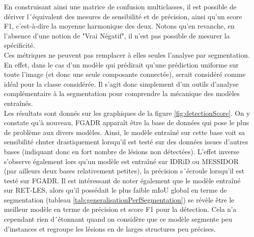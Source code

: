 En construisant ainsi une matrice de confusion multiclasses, il est possible de dériver l´équivalent des mesures de sensibilité et de précision, ainsi qu'un score F1, c'est-à-dire la moyenne harmonique des deux. Notons qu'en revanche, en l'absence d'une notion de "Vrai Négatif", il n'est pas possible de mesurer la spécificité. \\
Ces métriques ne peuvent pas remplacer à elles seules l'analyse par segmentation. En effet, dans le cas d'un modèle qui prédirait qu'une prédiction uniforme sur toute l'image (et donc une seule composante connectée), serait considéré comme idéal pour la classe considérée. Il s'agit donc simplement d'un outils d'analyse complémentaire à la segmentation pour comprendre la mécanique des modèles entraînés.
\\
Les résultats sont donnés sur les graphiques de la figure \ref{fig:detectionScore}. On y constate qu'à nouveau, \ac{FGADR} apparaît être la base de données qui pose le plus de problème aux divers modèles. Ainsi, le modèle entraîné sur cette base voit sa sensibilité chuter drastiquement lorsqu'il est testé sur des données issues d'autres bases (indiquant donc en fort nombre de lésions non détectées). L'effet inverse s'observe également lors qu'un modèle est entraîné sur IDRiD ou MESSIDOR (par ailleurs deux bases relativement petites), la précision s´écroule lorsqu'il est testé sur FGADR. Il est intéressant de noter également que le modèle entraîné sur RET-LES, alors qu'il possédait le plus faible mIoU global en terme de segmentation (tableau \ref{tab:generalisationPerfSegmentation}) se révèle être le meilleur modèle en terme de précision et score F1 pour la détection. Cela n'a cependant rien d´étonnant quand on considère que ce modèle segmente peu d'instances et regroupe les lésions en de larges structures peu précises.

